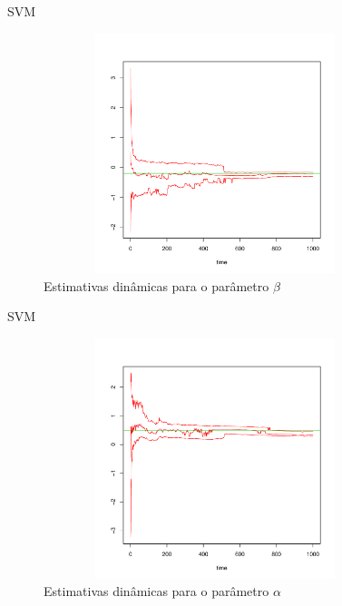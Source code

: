 \documentclass{beamer}
\begin{document}
\begin{frame}{SVM}


 \begin{figure}
\begin{center}
 \includegraphics[height=7cm,width =10cm]{beta_1_01_02_05.pdf}
 \end{center}
\caption{Estimativas dinâmicas para o parâmetro $\beta$ } 
\end{figure}

 
 \end{frame}
 
 
 \begin{frame}{SVM}


 \begin{figure}
\begin{center}
 \includegraphics[height=7cm,width =10cm]{alpha_1_01_02_05.pdf}
 \end{center}
\caption{Estimativas dinâmicas para o parâmetro $\alpha$ } 
\end{figure}

 \end{frame}
 
\end{document}
